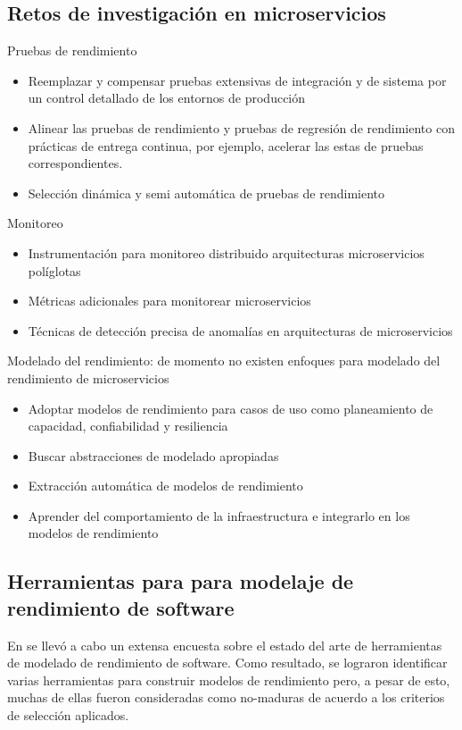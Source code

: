 \documentclass[11pt, twoside]{report}
\begin{document}
\subsection{Retos de investigación en microservicios}

Pruebas de rendimiento
\begin{itemize}
    \item Reemplazar y compensar pruebas extensivas de integración y de sistema por un control detallado de los entornos de producción
    \item Alinear las pruebas de rendimiento y pruebas de regresión de rendimiento con prácticas de entrega continua, por ejemplo, acelerar las estas de pruebas correspondientes.
    \item Selección dinámica y semi automática de pruebas de rendimiento
\end{itemize}

Monitoreo
\begin{itemize}
    \item Instrumentación para monitoreo distribuido arquitecturas microservicios políglotas 
    \item Métricas adicionales para monitorear microservicios
    \item Técnicas de detección precisa de anomalías en arquitecturas de microservicios
\end{itemize}


Modelado del rendimiento: de momento no existen enfoques para modelado del rendimiento de microservicios 
\begin{itemize}
    \item Adoptar modelos de rendimiento para casos de uso como planeamiento de capacidad, confiabilidad y resiliencia
    \item Buscar abstracciones de modelado apropiadas 
    \item Extracción automática de modelos de rendimiento
    \item Aprender del comportamiento de la infraestructura e integrarlo en los modelos de rendimiento
\end{itemize}




\subsection{Herramientas para para modelaje de rendimiento de software}
En \cite{thijmen-thesis} se llevó a cabo un extensa encuesta sobre el estado del arte de herramientas de modelado de rendimiento de software. Como resultado, se lograron identificar varias herramientas para construir modelos de rendimiento pero, a pesar de esto, muchas de ellas fueron consideradas como no-maduras de acuerdo a los criterios de selección aplicados.
\end{document}
